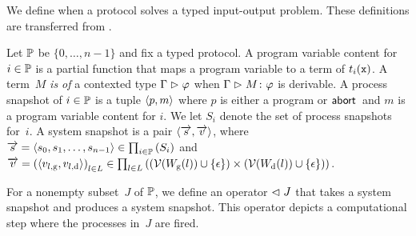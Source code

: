 {We define when a protocol solves a typed
input-output problem.
These definitions are transferred from \cite{Saks:1993vq}.

Let $\mathbb{P}$ be $\{0,\ldots, n-1\}$ and fix
a typed protocol.
A program variable content for $i\in\mathbb{P}$ is a
partial
function
that maps a program variable to a term of $t_i(\texttt{x})$.
A term~$M$ \textit{is of} a contexted type $\Gamma\vartriangleright\varphi$ when
$\Gamma\vartriangleright
{M} \colon{\varphi}$ is derivable.
A process snapshot of $i\in\mathbb{P}$ is a tuple
$\langle{p,m}\rangle$ where $p$ is either a program or $\mathsf{abort\,}$ and $m$ is a
program variable content for $i$.
We let $S_i$ denote the set of process snapshots for~$i$.
A system snapshot
is a pair $\langle{\overrightarrow s, \overrightarrow v}\rangle$, where $\overrightarrow s = \langle{s_0,
{s_1,{\ldots,s_{n-1}}}}\rangle \in
\prod_{i\in \mathbb{P}}\left(S_i\right)
$
and
$\overrightarrow v =
\left(\langle{{v}_{l, \mathrm g}, {v}_{l, \mathrm d}}\rangle\right)_{l\in L} \in \prod_{l\in
L}\left((\mathcal{V}(W_{\mathrm g}(l))\cup\{\epsilon\})\times (\mathcal{V}(W_{\mathrm d}(l))\cup\{\epsilon\})\right)
$.

For a nonempty subset~$J$ of $\mathbb{P}$, we define an operator $\vartriangleleft J$ that
takes a system snapshot and produces a system snapshot.
This operator depicts a computational step where the processes in~$J$
are fired.

}
